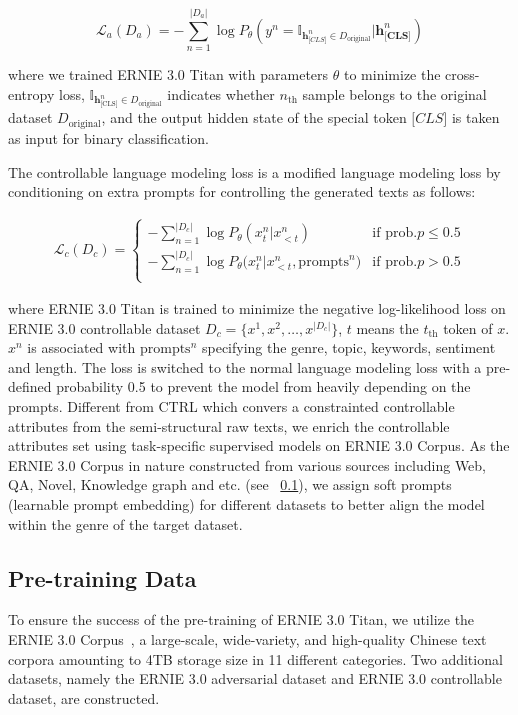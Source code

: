 \begin{equation}
    \mathcal{L}_a(D_{a}) = - \sum_{n=1}^{|D_{a}|} \log P_{\theta}(y^n=\mathbb{I}_{\mathbf{h}_{\textit{[CLS]}}^n \in D_{\text{original}}}| \mathbf{h}_{\textbf{[CLS]}}^n)
\end{equation}

where we trained ERNIE 3.0 Titan with parameters $\theta$ to minimize the cross-entropy loss, $\mathbb{I}_{\mathbf{h}_{\text{[CLS]}}^n \in D_{\text{original}}}$ indicates whether $n_{\text{th}}$ sample belongs to the original dataset $D_{\text{original}}$, and the output hidden state of the special token $\textit{[CLS]}$ is taken as input for binary classification.

The controllable language modeling loss is a modified language modeling loss by conditioning on extra prompts for controlling the generated texts as follows:

\begin{eqnarray} 
\mathcal{L}_{c}(D_{c}) = \begin{cases}
-\sum_{n=1}^{|D_{c}|} \log{P_\theta(x_t^n|x^n_{<t})} & \text{if prob.} p \le  0.5\\
-\sum_{n=1}^{|D_{c}|} \log{P_\theta(x_t^n|x^n_{<t}, \text{prompts}^{n}}) & \text{if prob.} p > 0.5\\
\end{cases}
\label{eq:controllable_loss}
\end{eqnarray}

where ERNIE 3.0 Titan is trained to minimize the negative log-likelihood loss on ERNIE 3.0 controllable dataset $D_{c}=\{x^1, x^2, \dots, x^{|D_{c}|}\}$, $t$ means the $t_{\text{th}}$ token of $x$. $x^n$ is associated with $\text{prompts}^{n}$ specifying the genre, topic, keywords, sentiment and length. The loss is switched to the normal language modeling loss with a pre-defined probability 0.5 to prevent the model from heavily depending on the prompts. Different from CTRL which convers a constrainted controllable attributes from the semi-structural raw texts, we enrich the controllable attributes set using task-specific supervised models on ERNIE 3.0 Corpus. As the ERNIE 3.0 Corpus in nature constructed from various sources including Web, QA, Novel, Knowledge graph and etc. (see ~\ref{sec:pre-training data}), we assign soft prompts (learnable prompt embedding) for different datasets to better align the model within the genre of the target dataset.

\subsection{Pre-training Data}\label{sec:pre-training data} To ensure the success of the pre-training of ERNIE 3.0 Titan, we utilize the ERNIE 3.0 Corpus~\cite{sun2021ernie}, a large-scale, wide-variety, and high-quality Chinese text corpora amounting to 4TB storage size in 11 different categories. Two additional datasets, namely the ERNIE 3.0 adversarial dataset and ERNIE 3.0 controllable dataset, are constructed.

